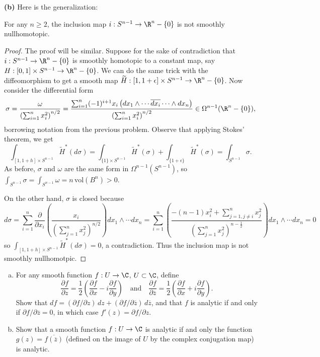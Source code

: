\documentclass[11pt,letterpaper]{article}
\begin{document}
\begin{solution}
    \textbf{(b)} Here is the generalization:
    \begin{claim}
        For any $n\geq 2$, the inclusion map $i : S^{n-1}\to \R^n-\{0\}$ is not smoothly nullhomotopic.
    \end{claim}
    \begin{proof}
        The proof will be similar. Suppose for the sake of contradiction that $i : S^{n-1} \to \R^n-\{0\}$ is smoothly homotopic to a constant map, say $H : [0,1]\times S^{n-1}\to \R^n-\{0\}$. We can do the same trick with the diffeomorphism to get a smooth map $\widetilde{H} : [1,1+\epsilon]\times S^{n-1}\to \R^n-\{0\}$. Now consider the differential form
        \[
            \sigma=\frac{\omega}{\left(\sum^n_{i=1}x_i^2\right)^{n /2}} = \frac{\sum^n_{i=1}(-1)^{i+1}x_i\left(dx_1\wedge\cdots\overline{dx_i}\cdots\wedge dx_n\right)}{\left(\sum^n_{i=1}x_i^2\right)^{n /2}}\in \Omega^{n-1}(\R^n-\{0\})
        ,\]   
        borrowing notation from the previous problem. Observe that applying Stokes' theorem, we get
        \[
            \int_{[1,1+h]\times S^{n-1}} \widetilde{H}^*(d\sigma)=\int_{\{1\}\times S^{n-1}}\widetilde{H}^*(\sigma)+\int_{\{1+\epsilon\}}\widetilde{H}^*(\sigma)=\int_{S^{n-1}}\sigma
        .\] 
        As before, $\sigma$ and $\omega$ are the same form in $\Omega^{n-1}(S^{n-1})$, so $\int_{S^{n-1}}\sigma = \int_{S^{n-1}} \omega = n\,\textrm{vol}(B^n)>0$. 
        
        On the other hand, $\sigma$ is closed because
        \[
            d\sigma=\sum_{i=1}^n\frac{\partial}{\partial x_i}\left(\frac{x_i}{\left(\sum^n_{j=1}x_j^2\right)^{n /2}}\right)dx_1\wedge\cdots dx_n=\sum^n_{i=1}\left(\frac{-(n-1)x_i^2+\sum^n_{j=1, j\neq i}x_j^2}{\left(\sum^n_{j=1}x_j^2\right)^{n -\frac{1}{2}}}\right)dx_1\wedge\cdots dx_n=0
        \] 
        so $\int_{[1,1+h]\times S^{n-1}}\widetilde{H}^*(d\sigma)=0$, a contradiction. Thus the inclusion map is not smoothly nullhomotpic. 
    \end{proof}
\end{solution}

\begin{problem}\noindent
    \begin{enumerate}[(a)]
        \item For any smooth function $f:U\to\C$, $U\subset\C$, define $$\frac{\partial f}{\partial z}=\frac12\left(\frac{\partial f}{\partial x}-i\frac{\partial f}{\partial y}\right) \quad \text{and} \quad \frac{\partial f}{\partial \overline{z}}=\frac12\left(\frac{\partial f}{\partial x}+i\frac{\partial f}{\partial y}\right).$$ Show that $df=(\partial f/\partial z)\,dz + (\partial f/\partial \overline{z})\,d\overline{z}$, and that $f$ is analytic if and only if $\partial f/\partial \overline{z}=0$, in which case $f'(z)=\partial f/\partial z$. 
         
        \item Show that a smooth function $f:U\to\C$ is analytic if and only the function $g(z)=\overline{f(\overline{z})}$ (defined on the image of $U$ by the complex conjugation map) is analytic. 
    \end{enumerate}
\end{problem}
\end{document}
